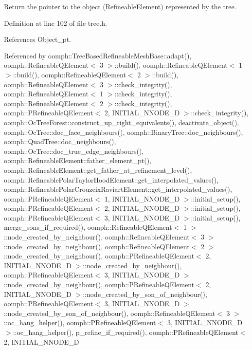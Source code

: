 Return the pointer to the object (\hyperlink{classoomph_1_1RefineableElement}{Refineable\+Element}) represented by the tree. 



Definition at line 102 of file tree.\+h.



References Object\+\_\+pt.



Referenced by oomph\+::\+Tree\+Based\+Refineable\+Mesh\+Base\+::adapt(), oomph\+::\+Refineable\+Q\+Element$<$ 3 $>$\+::build(), oomph\+::\+Refineable\+Q\+Element$<$ 1 $>$\+::build(), oomph\+::\+Refineable\+Q\+Element$<$ 2 $>$\+::build(), oomph\+::\+Refineable\+Q\+Element$<$ 3 $>$\+::check\+\_\+integrity(), oomph\+::\+Refineable\+Q\+Element$<$ 1 $>$\+::check\+\_\+integrity(), oomph\+::\+Refineable\+Q\+Element$<$ 2 $>$\+::check\+\_\+integrity(), oomph\+::\+P\+Refineable\+Q\+Element$<$ 2, I\+N\+I\+T\+I\+A\+L\+\_\+\+N\+N\+O\+D\+E\+\_\+D $>$\+::check\+\_\+integrity(), oomph\+::\+Oc\+Tree\+Forest\+::construct\+\_\+up\+\_\+right\+\_\+equivalents(), deactivate\+\_\+object(), oomph\+::\+Oc\+Tree\+::doc\+\_\+face\+\_\+neighbours(), oomph\+::\+Binary\+Tree\+::doc\+\_\+neighbours(), oomph\+::\+Quad\+Tree\+::doc\+\_\+neighbours(), oomph\+::\+Oc\+Tree\+::doc\+\_\+true\+\_\+edge\+\_\+neighbours(), oomph\+::\+Refineable\+Element\+::father\+\_\+element\+\_\+pt(), oomph\+::\+Refineable\+Element\+::get\+\_\+father\+\_\+at\+\_\+refinement\+\_\+level(), oomph\+::\+Refineable\+Polar\+Taylor\+Hood\+Element\+::get\+\_\+interpolated\+\_\+values(), oomph\+::\+Refineable\+Polar\+Crouzeix\+Raviart\+Element\+::get\+\_\+interpolated\+\_\+values(), oomph\+::\+P\+Refineable\+Q\+Element$<$ 1, I\+N\+I\+T\+I\+A\+L\+\_\+\+N\+N\+O\+D\+E\+\_\+D $>$\+::initial\+\_\+setup(), oomph\+::\+P\+Refineable\+Q\+Element$<$ 2, I\+N\+I\+T\+I\+A\+L\+\_\+\+N\+N\+O\+D\+E\+\_\+D $>$\+::initial\+\_\+setup(), oomph\+::\+P\+Refineable\+Q\+Element$<$ 3, I\+N\+I\+T\+I\+A\+L\+\_\+\+N\+N\+O\+D\+E\+\_\+D $>$\+::initial\+\_\+setup(), merge\+\_\+sons\+\_\+if\+\_\+required(), oomph\+::\+Refineable\+Q\+Element$<$ 1 $>$\+::node\+\_\+created\+\_\+by\+\_\+neighbour(), oomph\+::\+Refineable\+Q\+Element$<$ 3 $>$\+::node\+\_\+created\+\_\+by\+\_\+neighbour(), oomph\+::\+Refineable\+Q\+Element$<$ 2 $>$\+::node\+\_\+created\+\_\+by\+\_\+neighbour(), oomph\+::\+P\+Refineable\+Q\+Element$<$ 2, I\+N\+I\+T\+I\+A\+L\+\_\+\+N\+N\+O\+D\+E\+\_\+D $>$\+::node\+\_\+created\+\_\+by\+\_\+neighbour(), oomph\+::\+P\+Refineable\+Q\+Element$<$ 3, I\+N\+I\+T\+I\+A\+L\+\_\+\+N\+N\+O\+D\+E\+\_\+D $>$\+::node\+\_\+created\+\_\+by\+\_\+neighbour(), oomph\+::\+P\+Refineable\+Q\+Element$<$ 2, I\+N\+I\+T\+I\+A\+L\+\_\+\+N\+N\+O\+D\+E\+\_\+D $>$\+::node\+\_\+created\+\_\+by\+\_\+son\+\_\+of\+\_\+neighbour(), oomph\+::\+P\+Refineable\+Q\+Element$<$ 3, I\+N\+I\+T\+I\+A\+L\+\_\+\+N\+N\+O\+D\+E\+\_\+D $>$\+::node\+\_\+created\+\_\+by\+\_\+son\+\_\+of\+\_\+neighbour(), oomph\+::\+Refineable\+Q\+Element$<$ 3 $>$\+::oc\+\_\+hang\+\_\+helper(), oomph\+::\+P\+Refineable\+Q\+Element$<$ 3, I\+N\+I\+T\+I\+A\+L\+\_\+\+N\+N\+O\+D\+E\+\_\+D $>$\+::oc\+\_\+hang\+\_\+helper(), p\+\_\+refine\+\_\+if\+\_\+required(), oomph\+::\+P\+Refineable\+Q\+Element$<$ 2, I\+N\+I\+T\+I\+A\+L\+\_\+\+N\+N\+O\+D\+E\+\_\+D 